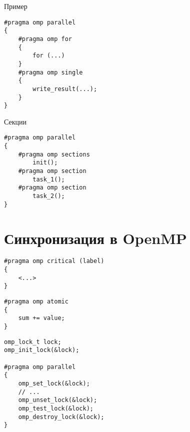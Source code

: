 \begin{frame}[fragile]{Пример}

\begin{lstlisting}
#pragma omp parallel
{
    #pragma omp for
    {
        for (...)
    }
    #pragma omp single
    {
        write_result(...);
    }
}
\end{lstlisting}

\end{frame}

\begin{frame}[fragile]{Секции}

\begin{lstlisting}
#pragma omp parallel
{
    #pragma omp sections
        init();
    #pragma omp section
        task_1();
    #pragma omp section
        task_2();
}
\end{lstlisting}

\end{frame}

\section{Синхронизация в OpenMP}

\begin{frame}[fragile]

\begin{lstlisting}
#pragma omp critical (label)
{
    <...>
}
\end{lstlisting}

\end{frame}

\begin{frame}[fragile]

\begin{lstlisting}
#pragma omp atomic
{
    sum += value;
}
\end{lstlisting}

\end{frame}

\begin{frame}[fragile]

\begin{lstlisting}
omp_lock_t lock;
omp_init_lock(&lock);

#pragma omp parallel
{
    omp_set_lock(&lock);
    // ...
    omp_unset_lock(&lock);
    omp_test_lock(&lock);
    omp_destroy_lock(&lock);
}
\end{lstlisting}

\end{frame}


